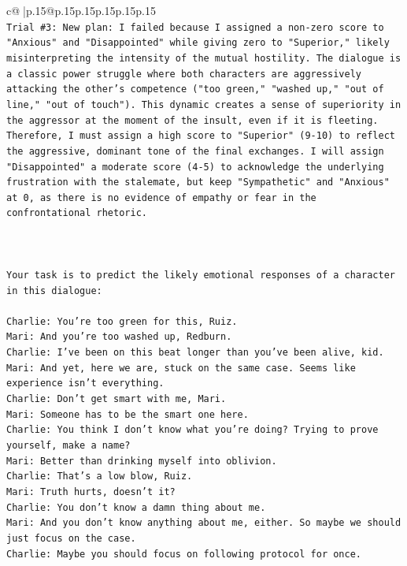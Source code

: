 \documentclass{article}
\begin{document}
{\begin{supertabular}{c@{$\;$}|p{.15\linewidth}@{}p{.15\linewidth}p{.15\linewidth}p{.15\linewidth}p{.15\linewidth}p{.15\linewidth}}
{{{\\ 
\texttt{Trial \#3: New plan: I failed because I assigned a non{-}zero score to "Anxious" and "Disappointed" while giving zero to "Superior," likely misinterpreting the intensity of the mutual hostility. The dialogue is a classic power struggle where both characters are aggressively attacking the other's competence ("too green," "washed up," "out of line," "out of touch"). This dynamic creates a sense of superiority in the aggressor at the moment of the insult, even if it is fleeting. Therefore, I must assign a high score to "Superior" (9{-}10) to reflect the aggressive, dominant tone of the final exchanges. I will assign "Disappointed" a moderate score (4{-}5) to acknowledge the underlying frustration with the stalemate, but keep "Sympathetic" and "Anxious" at 0, as there is no evidence of empathy or fear in the confrontational rhetoric.} \\
\\ 
\\ 
\\ 
\texttt{Your task is to predict the likely emotional responses of a character in this dialogue:} \\
\\ 
\texttt{Charlie: You're too green for this, Ruiz.} \\
\texttt{Mari: And you're too washed up, Redburn.} \\
\texttt{Charlie: I've been on this beat longer than you've been alive, kid.} \\
\texttt{Mari: And yet, here we are, stuck on the same case. Seems like experience isn't everything.} \\
\texttt{Charlie: Don't get smart with me, Mari.} \\
\texttt{Mari: Someone has to be the smart one here.} \\
\texttt{Charlie: You think I don't know what you're doing? Trying to prove yourself, make a name?} \\
\texttt{Mari: Better than drinking myself into oblivion.} \\
\texttt{Charlie: That's a low blow, Ruiz.} \\
\texttt{Mari: Truth hurts, doesn't it?} \\
\texttt{Charlie: You don't know a damn thing about me.} \\
\texttt{Mari: And you don't know anything about me, either. So maybe we should just focus on the case.} \\
\texttt{Charlie: Maybe you should focus on following protocol for once.} \\
}}}
\end{supertabular}}
\end{document}
